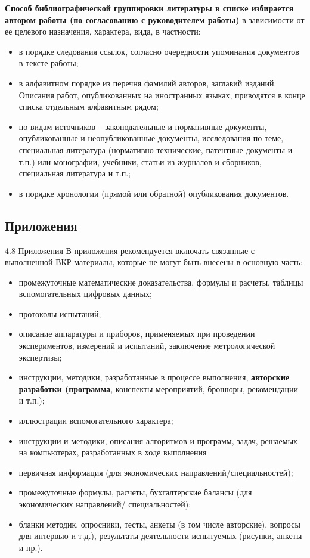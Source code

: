     \textbf{Способ библиографической группировки литературы в списке избирается автором
    работы (по согласованию с руководителем работы)} в зависимости от ее целевого назначения,
    характера, вида, в частности:
    \begin{itemize}
        \item  в порядке следования ссылок, согласно очередности упоминания документов в тексте
        работы;
        \item  в алфавитном порядке из перечня фамилий авторов, заглавий изданий. Описания
        работ, опубликованных на иностранных языках, приводятся в конце списка отдельным
        алфавитным рядом;
        \item по видам источников – законодательные и нормативные документы, опубликованные
        и неопубликованные документы, исследования по теме, специальная литература
        (нормативно-технические, патентные документы и т.п.) или монографии, учебники, статьи из
        журналов и сборников, специальная литература и т.п.;
        \item в порядке хронологии (прямой или обратной) опубликования документов.
    \end{itemize}

    \subsection{Приложения}
    4.8 Приложения
    В приложения рекомендуется включать связанные с выполненной ВКР материалы,
    которые не могут быть внесены в основную часть:
    \begin{itemize}
        \item  промежуточные математические доказательства, формулы и расчеты, таблицы вспомогательных цифровых данных;
        \item  протоколы испытаний;
        \item  описание аппаратуры и приборов, применяемых при проведении экспериментов,
        измерений и испытаний, заключение метрологической экспертизы;
        \item  инструкции, методики, разработанные в процессе выполнения, \textbf{авторские разработки
        (программа}, конспекты мероприятий, брошюры, рекомендации и т.п.);
        \item  иллюстрации вспомогательного характера;
        \item  инструкции и методики, описания алгоритмов и программ, задач, решаемых на
        компьютерах, разработанных в ходе выполнения
        \item  первичная информация (для экономических направлений/специальностей);
        \item  промежуточные формулы, расчеты, бухгалтерские балансы (для экономических
        направлений/ специальностей);
        \item  бланки методик, опросники, тесты, анкеты (в том числе авторские), вопросы для
        интервью и т.д.), результаты деятельности испытуемых (рисунки, анкеты и пр.).
    \end{itemize}

